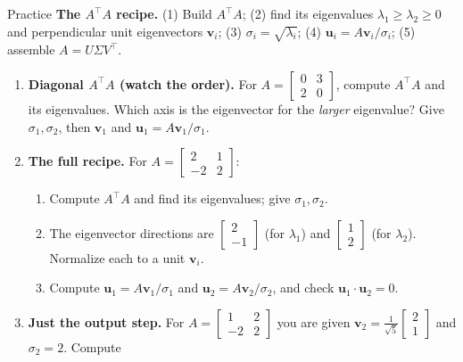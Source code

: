 \documentclass[10pt]{article}
\newcommand{\uu}{\mathbf{u}}
\newcommand{\vv}{\mathbf{v}}
\newcommand{\T}{^{\top}}
\begin{document}
\namedateperiod

\vspace{0.12in}

\begin{notesbox}{Practice}
\textbf{The $A\T A$ recipe.} (1) Build $A\T A$; (2) find its eigenvalues $\lambda_1\ge\lambda_2\ge0$ and
perpendicular unit eigenvectors $\vv_i$; (3) $\sigma_i=\sqrt{\lambda_i}$; (4) $\uu_i=A\vv_i/\sigma_i$;
(5) assemble $A=U\Sigma V\T$.

\begin{enumerate}[leftmargin=1.9em, itemsep=12pt]
  \item \textbf{Diagonal $A\T A$ (watch the order).} For $A=\begin{bmatrix} 0 & 3 \\ 2 & 0 \end{bmatrix}$,
        compute $A\T A$ and its eigenvalues. Which axis is the eigenvector for the \emph{larger}
        eigenvalue? Give $\sigma_1,\sigma_2$, then $\vv_1$ and $\uu_1=A\vv_1/\sigma_1$. 
  \item \textbf{The full recipe.} For $A=\begin{bmatrix} 2 & 1 \\ -2 & 2 \end{bmatrix}$:
    \begin{enumerate}[label=(\alph*), leftmargin=1.8em, itemsep=3pt]
      \item Compute $A\T A$ and find its eigenvalues; give $\sigma_1,\sigma_2$.
      \item The eigenvector directions are $\begin{bmatrix} 2 \\ -1 \end{bmatrix}$ (for $\lambda_1$) and
            $\begin{bmatrix} 1 \\ 2 \end{bmatrix}$ (for $\lambda_2$). Normalize each to a unit $\vv_i$.
      \item Compute $\uu_1=A\vv_1/\sigma_1$ and $\uu_2=A\vv_2/\sigma_2$, and check $\uu_1\cdot\uu_2=0$.
    \end{enumerate}
    \vspace{2.4cm}
  \item \textbf{Just the output step.} For $A=\begin{bmatrix} 1 & 2 \\ -2 & 2 \end{bmatrix}$ you are given
        $\vv_2=\frac{1}{\sqrt5}\begin{bmatrix} 2 \\ 1 \end{bmatrix}$ and $\sigma_2=2$. Compute

\end{enumerate}
\end{notesbox}
\end{document}
